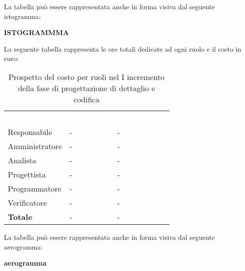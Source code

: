 La tabella può essere rappresentata anche in forma visiva dal seguente istogramma:

\textbf{ISTOGRAMMMA}


La seguente tabella rappresenta le ore totali dedicate ad ogni ruolo e il costo in euro:

\begin{table}[!htbp]
\begin{center}
\renewcommand{\arraystretch}{1.5}
\begin{tabular}{ m{}<{\centering}  m{}<{\centering} m{}<{\centering}}
	\rowcolor{darkblue}
	\textcolor{white}{\textbf{Ruolo}}&\textcolor{white}{\textbf{Totale ore}}&\textcolor{white}{\textbf{Costo totale}}\\ 

	Responsabile  & - & - \\	

	\rowcolor{gray!10} Amministratore & - & - \\
	
	Analista & - & - \\
	
	\rowcolor{gray!10} Progettista & - & - \\
	
	Programmatore & - & - \\
	
	\rowcolor{gray!10} Verificatore & - & - \\
	
	\textbf{Totale} & - & - \\
	
\end{tabular}
\caption{Prospetto del costo per ruoli nel I incremento della fase di progettazione di dettaglio e codifica}
\end{center}
\end{table}

La tabella può essere rappresentata anche in forma visiva dal seguente aerogramma:

\textbf{aerogramma}


